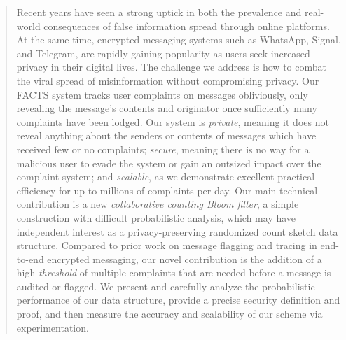 \begin{abstract}
    Recent years have seen a strong uptick in both the prevalence and real-world consequences of false information spread through online platforms. At the same time, encrypted messaging systems such as WhatsApp, Signal, and Telegram, are rapidly gaining popularity as users seek increased privacy in their digital lives. 
    The challenge we address is how to combat the viral spread of misinformation without compromising privacy. Our FACTS system tracks user complaints on messages obliviously, only revealing the message's contents and originator once sufficiently many complaints have been lodged.
    Our system is \emph{private}, meaning it does not reveal anything about the senders or contents of messages which have received few or no complaints; \emph{secure}, meaning there is no way for a malicious user to evade the system or gain an outsized impact over the complaint system; and \emph{scalable}, as we demonstrate excellent practical efficiency for up to millions of complaints per day.
    Our main technical contribution is a new \emph{collaborative counting Bloom filter}, a simple construction with difficult probabilistic analysis, which may have independent interest as a privacy-preserving randomized count sketch data structure.
    Compared to prior work on message flagging and tracing in end-to-end encrypted messaging, our novel contribution is the addition of a high \emph{threshold} of multiple complaints that are needed before a message is audited or flagged.
    We present and carefully analyze the probabilistic performance of our data structure, provide a precise security definition and proof, and then measure the accuracy and scalability of our scheme via experimentation.
\end{abstract}